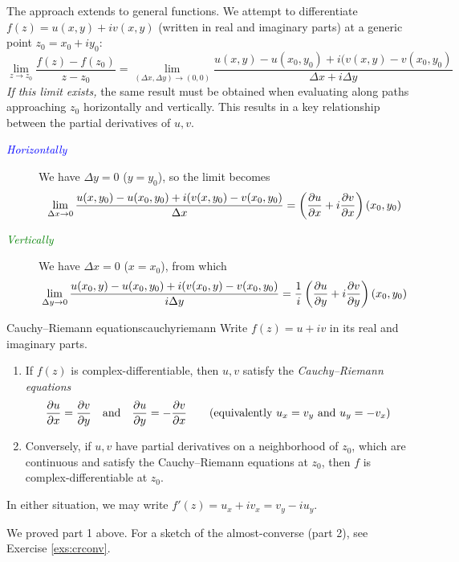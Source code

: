 The approach extends to general functions. We attempt to differentiate $f(z)=u(x,y)+iv(x,y)$ (written in real and imaginary parts) at a generic point $z_0=x_0+iy_0$:
\[
	\lim\limits_{z\to z_0}\frac{f(z)-f(z_0)}{z-z_0}= \lim\limits_{(\Delta x,\Delta y)\to (0,0)}\frac{u(x,y)-u(x_0,y_0)+i(v(x,y)-v(x_0,y_0)}{\Delta x+i\Delta y}
\]
\emph{If this limit exists,} the same result must be obtained when evaluating along paths approaching $z_0$ horizontally and vertically. This results in a key relationship between the partial derivatives of $u,v$.
\begin{description}
	\item[\normalfont\emph{\textcolor{blue}{Horizontally}}]\quad We have $\Delta y=0$ ($y=y_0$), so the limit becomes
	\[
		\lim_{\Delta x\to 0} \frac{u(x,y_0)-u(x_0,y_0)+i(v(x,y_0)-v(x_0,y_0)}{\Delta x} =\left(\partials[u]{x}+i\partials[v]{x}\right)(x_0,y_0)
	\]
	\item[\normalfont\emph{\textcolor{Green}{Vertically}}]\quad We have $\Delta x=0$ ($x=x_0$), from which
	\[
		\lim_{\Delta y\to 0} \frac{u(x_0,y)-u(x_0,y_0)+i(v(x_0,y)-v(x_0,y_0)}{i\Delta y} =\frac 1i\left(\partials[u]{y}+i\partials[v]{y}\right)(x_0,y_0)
	\]
\end{description}

\begin{thm}{Cauchy--Riemann equations}{cauchyriemann}
	Write $f(z)=u+iv$ in its real and imaginary parts.
	\begin{enumerate}
	  \item If $f(z)$ is complex-differentiable, then $u,v$ satisfy the \emph{Cauchy--Riemann equations}
		\[
			\partials[u]{x}=\partials[v]{y} \quad\text{and}\quad \partials[u]{y}=-\partials[v]{x} \tag{equivalently $u_x=v_y$ and $u_y=-v_x$}
		\]
	  \item Conversely, if $u,v$ have partial derivatives on a neighborhood of $z_0$, which are continuous and satisfy the Cauchy--Riemann equations at $z_0$, then $f$ is complex-differentiable at $z_0$.
	\end{enumerate}
	In either situation, we may write $f'(z)=u_x+iv_x =v_y-iu_y$.
\end{thm}
We proved part 1 above. For a sketch of the almost-converse (part 2), see Exercise \ref{exs:crconv}.
\goodbreak


